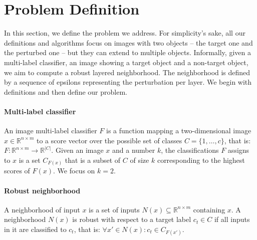 
\section{Problem Definition}
In this section, we define the problem we address.
For simplicity's sake, all our definitions and algorithms focus on images with two objects -- the target one and the perturbed one -- but they can extend to multiple objects.
Informally, given a multi-label classifier, an image showing a target object and a non-target object, we aim to compute a robust layered neighborhood.
The neighborhood is defined by a sequence of epsilons representing the perturbation per layer.
We begin with definitions and then define our problem.
\sloppy
\paragraph{Multi-label classifier}
An image multi-label classifier $F$ is a function mapping a two-dimensional image $x\in \mathbb{R}^{n \times m}$ to a score vector over the possible set of classes $C=\{1,\ldots,c\}$, that is:
$F: \mathbb{R}^{n \times m} \rightarrow {\mathbb{R}}^{|C|}$.
Given an image $x$ and a number $k$, the classifications $F$ assigns to $x$ is a set $C_{F(x)}$ that is a subset of $C$ of size $k$ corresponding to the highest scores of $F(x)$. We focus on $k=2$. %

\paragraph{Robust neighborhood}
A neighborhood of input $x$ is a set of inputs $N(x) \subseteq \mathbb{R}^{n \times m}$ containing $x$.
A neighborhood $N(x)$ is robust with respect to a target label $c_t \in C$ if all inputs in it are classified to $c_t$, that is: $\forall x' \in N(x): c_t \in C_{F(x')}$. %


